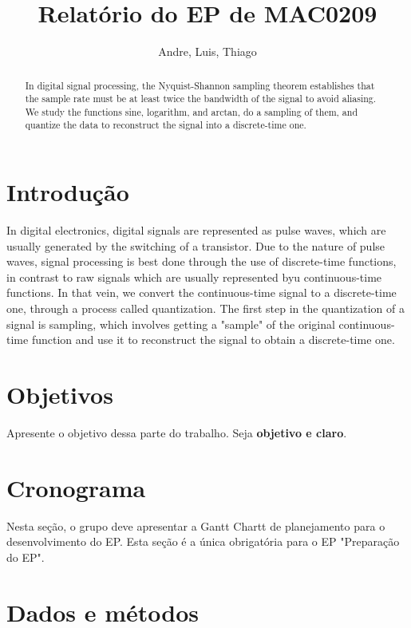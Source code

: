 \documentclass{article}
\title{Relatório do EP de MAC0209}
\author{Andre, Luis, Thiago}
\begin{document}
\maketitle


\begin{abstract}
In digital signal processing, the Nyquist-Shannon sampling theorem establishes that the sample rate must be at least twice the bandwidth of the signal to avoid aliasing. 
We study the functions sine, logarithm, and arctan, do a sampling of them, and quantize the data to reconstruct the signal into a discrete-time one. 

\end{abstract}

\newpage

\tableofcontents

\newpage

\section{Introdução}

In digital electronics, digital signals are represented as pulse waves, which are usually generated by the switching of a transistor. 
Due to the nature of pulse waves, signal processing is best done through the use of discrete-time functions, in contrast to raw signals which are usually represented byu continuous-time functions. 
In that vein, we convert the continuous-time signal to a discrete-time one, through a process called quantization. 
The first step in the quantization of a signal is sampling, which involves getting a "sample" of the original continuous-time function and use it to reconstruct the signal to obtain a discrete-time one. 

\section{Objetivos}

Apresente o objetivo dessa parte do trabalho. Seja {\bf objetivo e claro}.

\section{Cronograma}

Nesta seção, o grupo deve apresentar a Gantt Chartt de planejamento para o desenvolvimento do EP. Esta seção é a única obrigatória para o EP "Preparação do EP".

\section{Dados e métodos}
\end{document}
